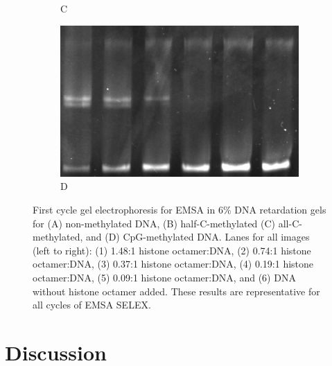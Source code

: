 \documentclass[parskip=full, numbers=noenddot]{scrreprt}
\begin{document}
\begin{figure}[htpb]
\begin{subfigure}[htpb]{0.4\textwidth}
    \caption{C}
    \label{fig:reconstnuc_c}
  \end{subfigure}
  \begin{subfigure}[htpb]{0.4\textwidth}
    \centering
    \includegraphics[width=\textwidth]{reconstnuc_d}
    \caption{D}
    \label{fig:reconstnuc_d}
  \end{subfigure}
  \caption{First cycle gel electrophoresis for EMSA in 6\% DNA retardation gels for (A) non-methylated DNA, (B) half-C-methylated (C) all-C-methylated, and (D) CpG-methylated DNA. Lanes for all images (left to right): (1) 1.48:1 histone octamer:DNA, (2) 0.74:1 histone octamer:DNA, (3) 0.37:1 histone octamer:DNA, (4) 0.19:1 histone octamer:DNA, (5) 0.09:1 histone octamer:DNA, and (6) DNA without histone octamer added. These results are representative for all cycles of EMSA SELEX.}
  \label{fig:reconstnuc}
\end{figure}


\section{Discussion}
\label{sec:emsaselex_discussion}


\end{document}
